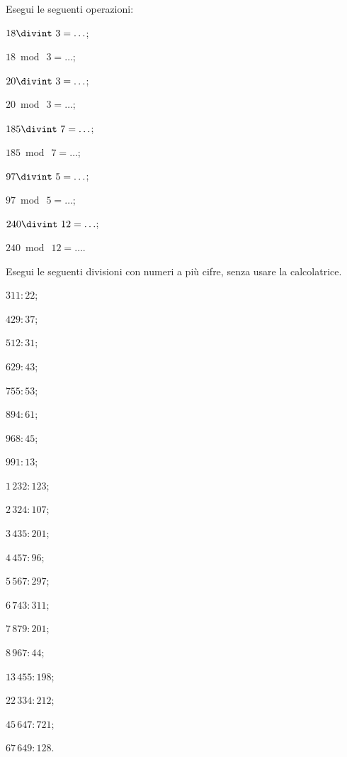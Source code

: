 \begin{esercizio}
\label{ese:1.6}
 Esegui le seguenti operazioni:
\begin{multicols}{2}
 \begin{enumeratea}
 \item $18\divint~3=\ldots$;
 \item $18\bmod~3=\ldots$;
 \item $20\divint~3=\ldots$;
 \item $20\bmod~3=\ldots$;
 \item $185\divint~7=\ldots$;
 \item $185\bmod~7=\ldots$;
 \item $97\divint~5=\ldots$;
 \item $97\bmod~5=\ldots$;
 \item $240\divint~12=\ldots$;
 \item $240\bmod~12=\ldots$.
 \end{enumeratea}
\end{multicols}
\end{esercizio}

\pagebreak
\begin{esercizio}
\label{ese:1.7}
 Esegui le seguenti divisioni con numeri a più cifre, senza usare la calcolatrice.
\begin{multicols}{4}
 \begin{enumeratea}
 \item $311:22$;
 \item $429:37$;
 \item $512:31$;
 \item $629:43$;
 \item $755:53$;
 \item $894:61$;
 \item $968:45$;
 \item $991:13$;
 \item $1\,232:123$;
 \item $2\,324:107$;
 \item $3\,435:201$;
 \item $4\,457:96$;
 \item $5\,567:297$;
 \item $6\,743:311$;
 \item $7\,879:201$;
 \item $8\,967:44$;
 \item $13\,455:198$;
 \item $22\,334:212$;
 \item $45\,647:721$;
 \item $67\,649:128$.
 \end{enumeratea}
\end{multicols}
\end{esercizio}

